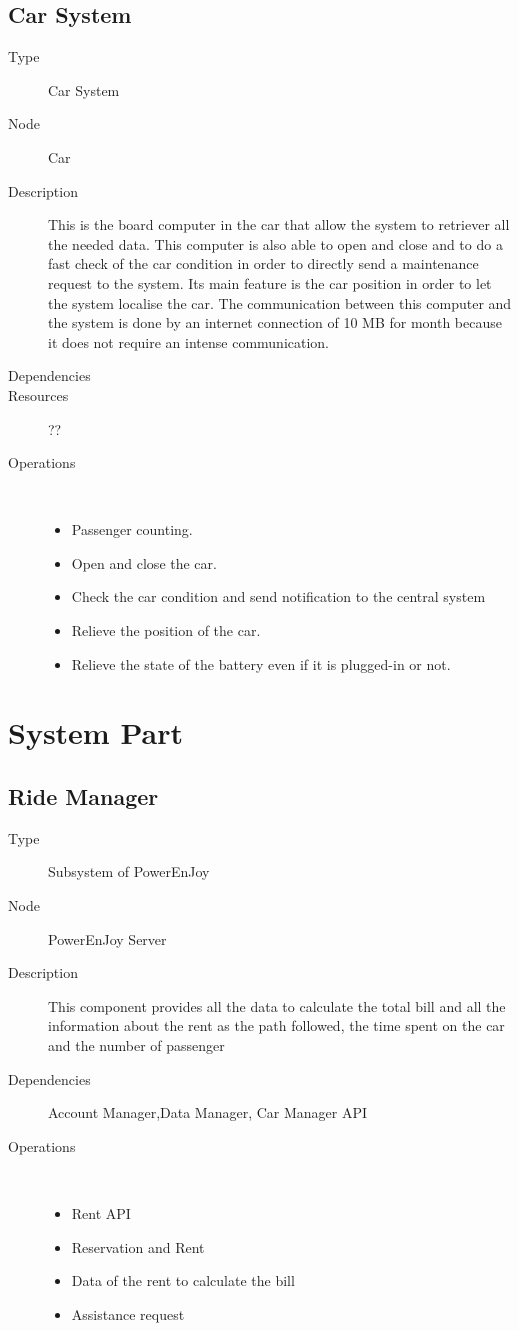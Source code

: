 \subsection{Car System}
\begin{description}
	\item[Type] Car System
	\item[Node] Car
	\item[Description] This is the board computer in the car that allow the system to retriever all the needed data. This computer is also able to open and close and to do a fast check of the car condition in order to directly send a maintenance request to the system. Its main feature is the car position in order to let the system localise the car. The communication between this computer and the system is done by an internet connection of 10 MB for month because it does not require an intense communication.
	\item[Dependencies] 
	\item[Resources] ??
	\item[Operations] \ \\
		\begin{itemize}
			\item Passenger counting.
			\item Open and close the car.
			\item Check the car condition and send notification to the central system
			\item Relieve the position of the car.
			\item Relieve the state of the battery even if it is plugged-in or not. 
		\end{itemize}
\end{description}


\section{System Part}
\subsection{Ride Manager}
\begin{description}
	\item[Type] Subsystem of PowerEnJoy
	\item[Node] PowerEnJoy Server
	\item[Description] This component provides all the data to calculate the total bill and all the information about the rent as the path followed, the time spent on the car and the number of passenger
	\item[Dependencies] Account Manager,Data Manager, Car Manager API
	\item[Operations] \ \\
		\begin{itemize}
			\item Rent API
			\item Reservation and Rent 
			\item Data of the rent to calculate the bill
			\item Assistance request
	\end{itemize}
\end{description}


